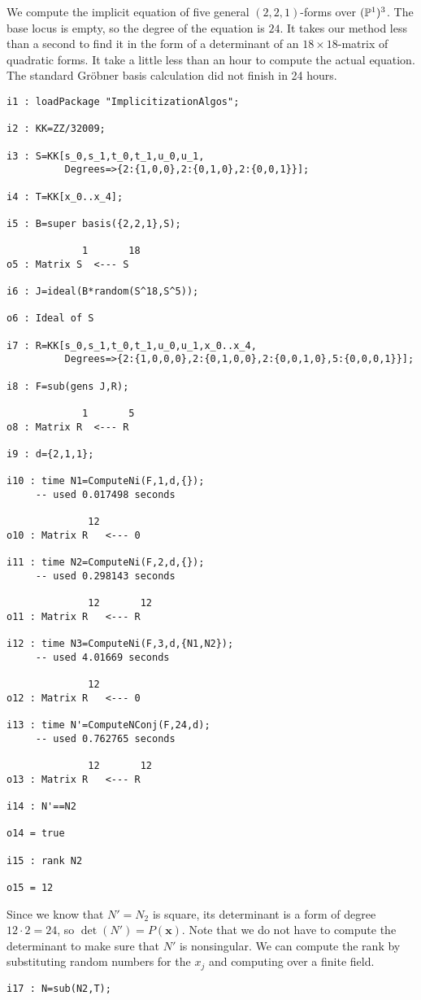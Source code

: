 \documentclass[fleqn,reqno]{amsart}
\begin{document}
\begin{example}[$\mt{ex602}$]
\label{ex602}
We compute the implicit equation of five general $(2,2,1)$-forms over $(\mathbb{P}^1)^3$.
The base locus is empty, so the degree of the equation is $24$.
It takes our method less than a second to find it in the form of
a determinant of an $18\times18$-matrix of quadratic forms.
It take a little less than an hour to compute the actual equation.
The standard Gr\"obner basis calculation did not finish in 24 hours.
\begin{verbatim}
i1 : loadPackage "ImplicitizationAlgos";

i2 : KK=ZZ/32009;

i3 : S=KK[s_0,s_1,t_0,t_1,u_0,u_1,
          Degrees=>{2:{1,0,0},2:{0,1,0},2:{0,0,1}}];

i4 : T=KK[x_0..x_4];

i5 : B=super basis({2,2,1},S);

             1       18
o5 : Matrix S  <--- S

i6 : J=ideal(B*random(S^18,S^5));

o6 : Ideal of S

i7 : R=KK[s_0,s_1,t_0,t_1,u_0,u_1,x_0..x_4,
          Degrees=>{2:{1,0,0,0},2:{0,1,0,0},2:{0,0,1,0},5:{0,0,0,1}}];

i8 : F=sub(gens J,R);

             1       5
o8 : Matrix R  <--- R

i9 : d={2,1,1};

i10 : time N1=ComputeNi(F,1,d,{});
     -- used 0.017498 seconds

              12
o10 : Matrix R   <--- 0

i11 : time N2=ComputeNi(F,2,d,{});
     -- used 0.298143 seconds

              12       12
o11 : Matrix R   <--- R

i12 : time N3=ComputeNi(F,3,d,{N1,N2});
     -- used 4.01669 seconds

              12
o12 : Matrix R   <--- 0

i13 : time N'=ComputeNConj(F,24,d);
     -- used 0.762765 seconds

              12       12
o13 : Matrix R   <--- R

i14 : N'==N2

o14 = true

i15 : rank N2

o15 = 12
\end{verbatim}
Since we know that $N'=N_2$ is square,
its determinant is a form of degree $12\cdot2=24$,
so $\det(N')=P(\mathbf x)$.
Note that we do not have to compute the determinant to make sure that $N'$ is nonsingular.
We can compute the rank by substituting random numbers for the $x_j$
and computing over a finite field.
\begin{verbatim}
i17 : N=sub(N2,T);


\end{verbatim}
\end{example}
\end{document}
